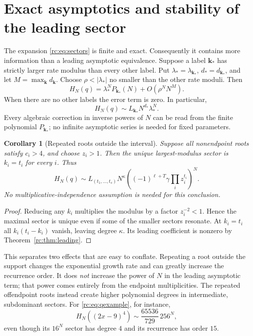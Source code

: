 \documentclass[11pt,a4paper]{article}
\numberwithin{equation}{section}
\newtheorem{corollary}[theorem]{Corollary}
\theoremstyle{definition}
\theoremstyle{remark}
\newcommand{\bk}{\boldsymbol{k}}
\begin{document}
\section{Exact asymptotics and stability of the leading sector}\label{rc:sec:asymptotics}

The expansion \eqref{rc:eq:sectors} is finite and exact.  Consequently it
contains more information than a leading asymptotic equivalence.
Suppose a label $\bk_*$ has strictly larger rate modulus than every
other label.  Put $\lambda_* =\lambda_{\bk_*}$,
$d_*=d_{\bk_*}$, and let $M=\max_{\bk}d_{\bk}$.
Choose $\rho<|\lambda_*|$ no smaller than the other rate moduli.
Then
\begin{equation}\label{rc:eq:asymptotic}
 H_N(q)=\lambda_*^N P_{\bk_*}(N)+O(\rho^N N^M).
\end{equation}
When there are no other labels the error term is zero.  In particular,
\[
 H_N(q)\sim L_{\bk_*}N^{d_*}\lambda_*^N.
\]
Every algebraic correction in inverse powers of $N$ can be read from the
finite polynomial $P_{\bk_*}$; no infinite asymptotic series is needed
for fixed parameters.

\begin{corollary}[Repeated roots outside the interval]\label{rc:cor:outside}
Suppose all nonendpoint roots satisfy $c_i>4$, and choose $z_i>1$.
Then the unique largest-modulus sector is $k_i=t_i$ for every $i$.
Thus
\begin{equation}\label{rc:eq:outside}
 H_N(q)\sim L_{(t_1,\ldots,t_s)}N^{\kappa}
       \left((-1)^{\ell+T}\gamma\prod_i z_i^{t_i}\right)^N.
\end{equation}
No multiplicative-independence assumption is needed for this conclusion.
\end{corollary}
\begin{proof}
Reducing any $k_i$ multiplies the modulus by a factor $z_i^{-2}<1$.
Hence the maximal sector is unique even if some of the smaller sectors
resonate.  At $k_i=t_i$ all $k_i(t_i-k_i)$ vanish, leaving degree
$\kappa$.  Its leading coefficient is nonzero by
Theorem~\ref{rc:thm:leading}.
\end{proof}

This separates two effects that are easy to conflate.  Repeating a root
outside the support changes the exponential growth rate and can greatly
increase the recurrence order.  It does \emph{not} increase the power of
$N$ in the leading asymptotic term; that power comes entirely from the
endpoint multiplicities.  The repeated offendpoint roots instead create
higher polynomial degrees in intermediate, subdominant sectors.
For \eqref{rc:eq:qexample}, for instance,
\[
 H_N((2x-9)^4)\sim\frac{65536}{729}\,256^N,
\]
even though its $16^N$ sector has degree $4$ and its recurrence has
order $15$.
\end{document}
